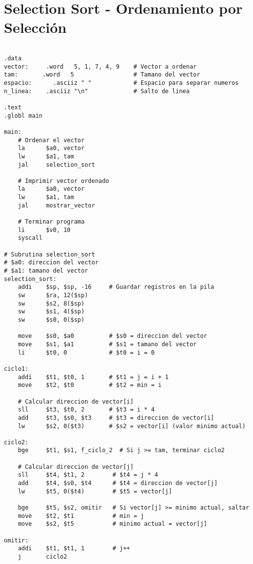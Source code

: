 \documentclass{article}
\begin{document}
\section*{Selection Sort - Ordenamiento por Selección}
\begin{lstlisting}

.data
vector:     .word   5, 1, 7, 4, 9    # Vector a ordenar
tam:       .word   5                 # Tamano del vector
espacio:      .asciiz " "            # Espacio para separar numeros
n_linea:    .asciiz "\n"             # Salto de linea

.text
.globl main

main:
    # Ordenar el vector
    la      $a0, vector
    lw      $a1, tam
    jal     selection_sort
    
    # Imprimir vector ordenado
    la      $a0, vector
    lw      $a1, tam
    jal     mostrar_vector
    
    # Terminar programa
    li      $v0, 10
    syscall

# Subrutina selection_sort
# $a0: direccion del vector
# $a1: tamano del vector
selection_sort:
    addi    $sp, $sp, -16     # Guardar registros en la pila
    sw      $ra, 12($sp)
    sw      $s2, 8($sp)
    sw      $s1, 4($sp)
    sw      $s0, 0($sp)
    
    move    $s0, $a0          # $s0 = direccion del vector
    move    $s1, $a1          # $s1 = tamano del vector
    li      $t0, 0            # $t0 = i = 0
    
ciclo1:
    addi    $t1, $t0, 1       # $t1 = j = i + 1
    move    $t2, $t0          # $t2 = min = i
    
    # Calcular direccion de vector[i]
    sll     $t3, $t0, 2       # $t3 = i * 4
    add     $t3, $s0, $t3     # $t3 = direccion de vector[i]
    lw      $s2, 0($t3)       # $s2 = vector[i] (valor minimo actual)
    
ciclo2:
    bge     $t1, $s1, f_ciclo_2  # Si j >= tam, terminar ciclo2
    
    # Calcular direccion de vector[j]
    sll     $t4, $t1, 2        # $t4 = j * 4
    add     $t4, $s0, $t4      # $t4 = direccion de vector[j]
    lw      $t5, 0($t4)        # $t5 = vector[j]
    
    bge     $t5, $s2, omitir   # Si vector[j] >= minimo actual, saltar
    move    $t2, $t1           # min = j
    move    $s2, $t5           # minimo actual = vector[j]
    
omitir:
    addi    $t1, $t1, 1        # j++
    j       ciclo2
    

\end{lstlisting}
\end{document}
